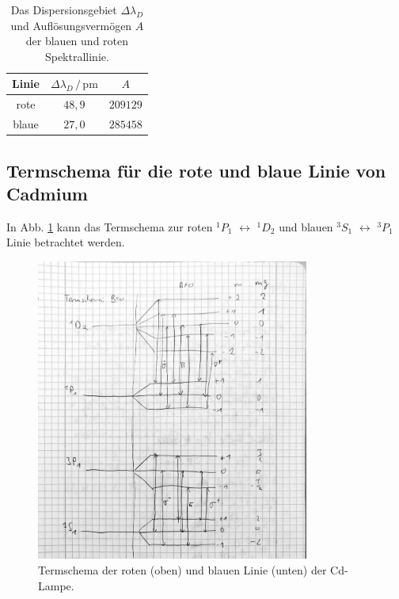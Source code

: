\begin{table}
    \centering
    \caption{Das Dispersionsgebiet $\Delta \lambda_D$ und Auflösungsvermögen $A$ der blauen und roten Spektrallinie.}
    \begin{tabular}{c c c}
        \toprule
        Linie & $\Delta \lambda_D \,/\, \si{\pico\metre}$ & $A$ \\
        \midrule
        rote & $48,9$ & $209129$ \\
        blaue & $27,0$ & $285458$ \\
        \bottomrule
    \end{tabular}
    \label{tab:aufloesung_dispersion}
\end{table}
\FloatBarrier

\subsection{Termschema für die rote und blaue Linie von Cadmium}
In Abb. \ref{fig:termschema_cd} kann das Termschema zur roten $ ^1 P_1$ $\leftrightarrow$ $^1 D_2$ und blauen $ ^3 S_1$ $\leftrightarrow$ $^3 P_1$ Linie betrachtet werden.
\begin{figure}
    \centering
    \includegraphics[width=0.8\textwidth]{content/data/termschema_skizze.pdf}
    \caption{Termschema der roten (oben) und blauen Linie (unten) der Cd-Lampe.}
    \label{fig:termschema_cd}
\end{figure}

